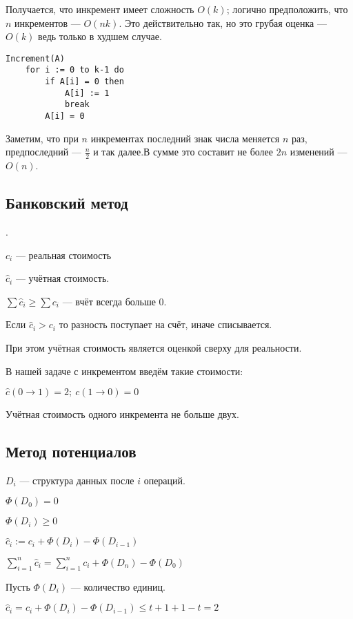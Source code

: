 Получается, что инкремент имеет сложность $O(k)$; логично предположить, что $n$ инкрементов --- $O(nk)$. Это действительно так, но это грубая оценка --- $O(k)$ ведь только в худшем случае.

\begin{lstlisting}
Increment(A)
    for i := 0 to k-1 do
        if A[i] = 0 then
            A[i] := 1
            break
        A[i] = 0
\end{lstlisting}

Заметим, что при $n$ инкрементах последний знак числа меняется $n$ раз, предпоследний --- $\frac{n}{2}$ и так далее.В сумме это составит не более $2n$ изменений ---$O(n)$.

\subsection{Банковский метод}.

$c_i$ --- реальная стоимость

$\hat c_i$ --- учётная стоимость.

$\sum \hat c_i \geqslant \sum c_i$ --- вчёт всегда больше 0.

Если $\hat c_i > c_i$ то разность поступает на счёт, иначе списывается.

При этом учётная стоимость является оценкой сверху для реальности.

В нашей задаче с инкрементом введём такие стоимости:

$\hat c (0\to 1) = 2;\ c (1\to 0) = 0$ 

Учётная стоимость одного инкремента не больше двух.

\subsection{Метод потенциалов}

$D_i$ --- структура данных после $i$ операций.

$\Phi(D_0) = 0$

$\Phi(D_i) \geqslant 0$

$\hat c_i := c_i + \Phi(D_i) - \Phi(D_{i-1})$

$\sum\limits_{i=1}^n\hat c_i = \sum\limits_{i=1}^n c_i +\Phi(D_n) - \Phi(D_0)$

Пусть $\Phi(D_i)$ --- количество единиц.

$\hat c_i = c_i + \Phi(D_i) - \Phi(D_{i-1}) \leqslant t+1+1-t = 2$


